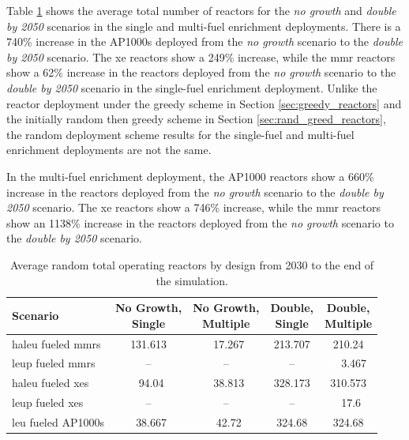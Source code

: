 Table \ref{tab:random_reac_avg} shows the average total number of reactors for the \textit{no growth} and \textit{double by 2050} scenarios in the single and multi-fuel enrichment deployments. There is a 740\% increase in the AP1000s deployed from the \textit{no growth} scenario to the \textit{double by 2050} scenario. The \gls{xe} reactors show a 249\% increase, while the \gls{mmr} reactors show a 62\% increase in the reactors deployed from the \textit{no growth} scenario to the \textit{double by 2050} scenario in the single-fuel enrichment deployment. Unlike the reactor deployment under the greedy scheme in Section \ref{sec:greedy_reactors} and the initially random then greedy scheme in Section \ref{sec:rand_greed_reactors}, the random deployment scheme results for the single-fuel and multi-fuel enrichment deployments are not the same.

In the multi-fuel enrichment deployment, the AP1000 reactors show a 660\% increase in the reactors deployed from the \textit{no growth} scenario to the \textit{double by 2050} scenario. The \gls{xe} reactors show a 746\% increase, while the \gls{mmr} reactors show an 1138\% increase in the reactors deployed from the \textit{no growth} scenario to the \textit{double by 2050} scenario.

\begin{table}[H]
    \centering
    \caption{Average random total operating reactors by design from 2030 to the end of the simulation.}
    \label{tab:random_reac_avg}
    \begin{tabular}{l c c c c}
       \toprule
       Scenario & \shortstack{No Growth,\\ Single} & \shortstack{No Growth,\\ Multiple} & \shortstack{Double,\\ Single} & \shortstack{Double,\\ Multiple}  \\
       \midrule
       \gls{haleu} fueled \glspl{mmr} & 131.613 & \textcolor{white}{0}17.267  & 213.707 & 210.24  \\
       \gls{leup} fueled \glspl{mmr}  & --      & --      & --      & \textcolor{white}{00}3.467   \\
       \gls{haleu} fueled \glspl{xe}  & \textcolor{white}{0}94.04   & \textcolor{white}{0}38.813  & 328.173 & 310.573 \\
       \gls{leup} fueled \glspl{xe}   & --      & --      & --      & \textcolor{white}{0}17.6    \\
       \gls{leu} fueled AP1000s       & \textcolor{white}{0}38.667  & \textcolor{white}{0}42.72   & 324.68  & 324.68  \\
       \bottomrule
    \end{tabular}
\end{table}




